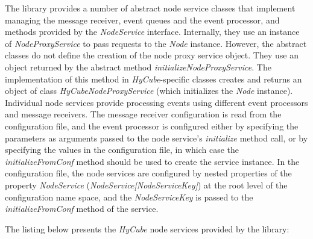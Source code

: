 The library provides a number of abstract node service classes that implement managing the message receiver, event queues and the event processor, and methods provided by the \emph{NodeService} interface. Internally, they use an instance of \emph{NodeProxyService} to pass requests to the \emph{Node} instance. However, the abstract classes do not define the creation of the node proxy service object. They use an object returned by the abstract method \emph{initializeNodeProxyService}. The implementation of this method in \emph{HyCube}-specific classes creates and returns an object of class \emph{HyCubeNodeProxyService} (which initializes the \emph{Node} instance). Individual node services provide processing events using different event processors and message receivers. The message receiver configuration is read from the configuration file, and the event processor is configured either by specifying the parameters as arguments passed to the node service's \emph{initialize} method call, or by specifying the values in the configuration file, in which case the \emph{initializeFromConf} method should be used to create the service instance. In the configuration file, the node services are configured by nested properties of the property \emph{NodeService} (\emph{NodeService[NodeServiceKey]}) at the root level of the configuration name space, and the \emph{NodeServiceKey} is passed to the \emph{initializeFromConf} method of the service.

The listing below presents the \emph{HyCube} node services provided by the library:

